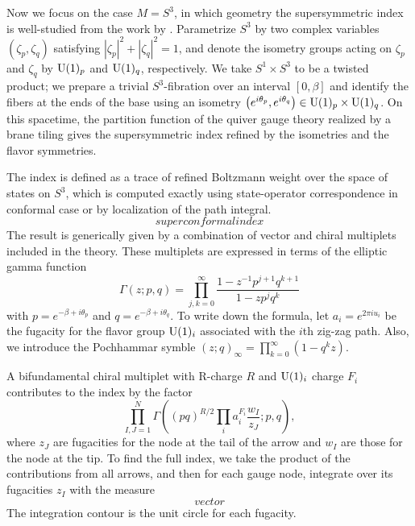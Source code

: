 Now we focus on the case $M=S^{3}$, in which geometry the supersymmetric
index is well-studied from the work by \cite{Romelsberger:2005eg,Kinney:2005ej,Festuccia:2011ws}. Parametrize $S^{3}$ by two complex variables
$\left(\zeta_{p},\zeta_{q}\right)$ satisfying $\left|\zeta_{p}\right|^{2}+\left|\zeta_{q}\right|^{2}=1$,
and denote the isometry groups acting on $\zeta_{p}$ and $\zeta_{q}$
by $\mathrm{U}(1)_{p}$ and $\mathrm{U}(1)_{q}$, respectively. We take $S^{1}\times S^{3}$
to be a twisted product; we prepare a trivial $S^{3}$-fibration over
an interval $[0,\beta]$ and identify the fibers at the ends of the
base using an isometry $\left(e^{i\theta_{p}},e^{i\theta_{q}}\right)\in \mathrm{U}(1)_{p}\times \mathrm{U}(1)_{q}$.
On this spacetime, the partition function of the quiver gauge theory
realized by a brane tiling gives the supersymmetric index refined
by the isometries and the flavor symmetries. 

The index is defined as a trace of refined Boltzmann weight over the
space of states on $S^{3}$, which is computed exactly using state-operator
correspondence in conformal case or by localization of the path integral.
\begin{equation}
    superconformalindex
\end{equation}
The result is generically given by a combination of vector and chiral
multiplets included in the theory. These multiplets are expressed
in terms of the elliptic gamma function 
\begin{equation}
    \Gamma\left(z;p,q\right)  =  \prod_{j,k=0}^{\infty}  \frac{1-z^{-1}p^{j+1}q^{k+1}}{1-zp^{j}q^{k}}
\end{equation}
with $p=e^{-\beta+i\theta_{p}}$ and $q=e^{-\beta+i\theta_{q}}$.
To write down the formula, let $a_{i}=e^{2\pi iu_{i}}$ be the fugacity
for the flavor group $\mathrm{U}(1)_i$ associated with the $i$th zig-zag path.
Also, we introduce the Pochhammar symble $\left(z;q\right)_{\infty}=\prod_{k=0}^{\infty}\left(1-q^{k}z\right)$. 

A bifundamental chiral multiplet with R-charge $R$ and $\mathrm{U}(1)_i$ charge
$F_{i}$ contributes to the index by the factor
\begin{equation}
    \prod_{I,J=1}^{N}  \Gamma\left((pq)^{R/2}\prod_{i}a_{i}^{F_{i}}\frac{w_{I}}{z_{J}};p,q\right),
\end{equation}
 where $z_{J}$ are fugacities for the node at the tail of the arrow
and $w_{I}$ are those for the node at the tip. To find the full index,
we take the product of the contributions from all arrows, and then
for each gauge node, integrate over its fugacities $z_{I}$ with the
measure
\begin{equation}
vector
\end{equation}
 The integration contour is the unit circle for each fugacity. 


